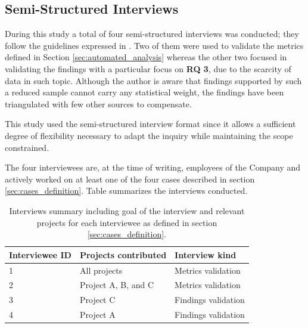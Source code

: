 \subsection{Semi-Structured Interviews} \label{sec:semi-structured_interviews}
During this study a total of four semi-structured interviews was conducted; they follow the guidelines expressed in \cite{interview_guideline}. Two of them were used to validate the metrics defined in Section \ref{sec:automated_analysis} whereas the other two focused in validating the findings with a particular focus on \textbf{RQ 3}, due to the scarcity of data in such topic. Although the author is aware that findings supported by such a reduced sample cannot carry any statistical weight, the findings have been triangulated with few other sources to compensate.

This study used the semi-structured interview format since it allows a sufficient degree of flexibility necessary to adapt the inquiry while maintaining the scope constrained.

The four interviewees are, at the time of writing, employees of the Company and actively worked on at least one of the four cases described in section \ref{sec:cases_definition}. Table summarizes the interviews conducted.

\begin{table}[!htbp]
	\centering
	\tabulinesep=1.2mm
	\begin{tabu} to \textwidth {|X|X|X|}

		\hline
		\textbf{Interviewee ID} & \textbf{Projects contributed} & \textbf{Interview kind} \\
		\hline

		1 & All projects & Metrics validation \\
		\hline

		2 & Project A, B, and C & Metrics validation \\
		\hline

		3 & Project C & Findings validation \\
		\hline

		4 & Project A & Findings validation \\
		\hline

	\end{tabu}
	\label{tab:interviews_summary}
	\caption[Summary of conducted interviews]{Interviews summary including goal of the interview and relevant projects for each interviewee as defined in section \ref{sec:cases_definition}.}
\end{table}

